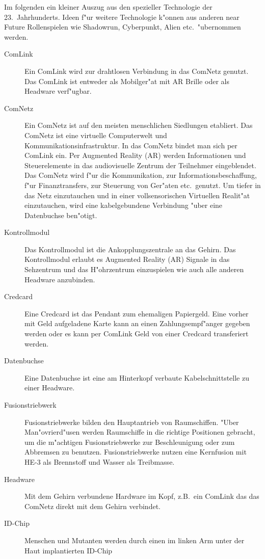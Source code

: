 Im folgenden ein kleiner Auszug aus den spezieller Technologie der 23.~Jahrhunderts. Ideen f"ur weitere Technologie k"onnen aus anderen near Future Rollenspielen wie Shadowrun, Cyberpunkt, Alien etc.~"ubernommen werden.

\begin{description}
\item [ComLink] Ein ComLink wird zur drahtlosen Verbindung in das ComNetz genutzt. Das ComLink ist entweder als
      Mobilger"at mit AR Brille oder als Headware verf"ugbar.
\item [ComNetz] Ein ComNetz ist auf den meisten menschlichen Siedlungen etabliert. Das ComNetz ist eine virtuelle
      Computerwelt und Kommunikationsinfrastruktur. In das ComNetz bindet man sich per ComLink ein. Per Augmented Reality (AR) werden Informationen und Steuerelemente in das audiovisuelle Zentrum der Teilnehmer eingeblendet. Das ComNetz wird f"ur die Kommunikation, zur Informationsbeschaffung, f"ur Finanztransfers, zur Steuerung von Ger"aten etc.~genutzt. Um tiefer in das Netz einzutauchen und in einer vollsensorischen Virtuellen Realit"at einzutauchen, wird eine kabelgebundene Verbindung "uber eine Datenbuchse ben"otigt.
\item [Kontrollmodul] Das Kontrollmodul ist die Ankopplungszentrale an das Gehirn. Das Kontrollmodul erlaubt es Augmented Reality (AR)    
      Signale in das Sehzentrum und das H"ohrzentrum einzuspielen wie auch alle anderen Headware anzubinden.
\item [Credcard] Eine Credcard ist das Pendant zum ehemaligen Papiergeld. Eine vorher mit Geld aufgeladene Karte kann an
      einen Zahlungsempf"anger gegeben werden oder es kann per ComLink Geld von einer Credcard transferiert werden.
\item [Datenbuchse] Eine Datenbuchse ist eine am Hinterkopf verbaute Kabelschnittstelle zu einer Headware.
\item [Fusionstriebwerk] Fusionstriebwerke bilden den Hauptantrieb von Raumschiffen. "Uber Man"ovrierd"usen werden
      Raumschiffe in die richtige Positionen gebracht, um die m"achtigen Fusionstriebwerke zur Beschleunigung oder zum Abbremsen zu benutzen. Fusionstriebwerke nutzen eine Kernfusion mit HE-3 als Brennstoff und Wasser als Treibmasse.
\item [Headware] Mit dem Gehirn verbundene Hardware im Kopf, z.B.~ein ComLink das das ComNetz direkt mit dem Gehirn
      verbindet.
\item [ID-Chip] Menschen und Mutanten werden durch einen im linken Arm unter der Haut implantierten ID-Chip

\end{description}
